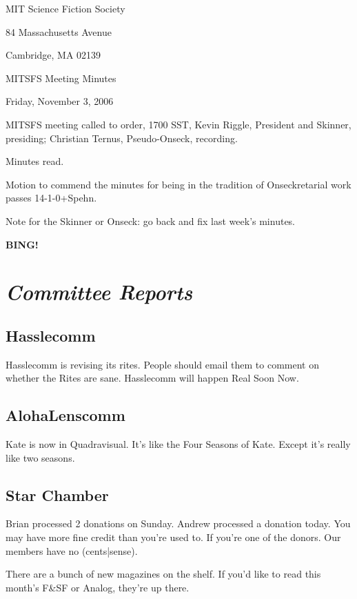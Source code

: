 \documentclass[10pt]{article}
\newcommand{\bing}{{\bf BING!} }
\newcommand{\goto}[1]{\bing \vskip 12pt \section*{{\em{#1}}}}
\begin{document}
\begin{center}

MIT Science Fiction Society

84 Massachusetts Avenue

Cambridge, MA 02139

\vspace{12pt}

MITSFS Meeting Minutes

Friday, November 3, 2006

\end{center}

\vspace{18pt}

\setlength{\parskip}{6pt}

\noindent
MITSFS meeting called to order, 1700 SST,
Kevin Riggle, President and Skinner, presiding; Christian Ternus, Pseudo-Onseck, recording.

Minutes read.

Motion to commend the minutes for being in the tradition of Onseckretarial work passes 14-1-0+Spehn.

Note for the Skinner or Onseck: go back and fix last week's minutes.

\goto{Committee Reports}

\subsection*{Hasslecomm}
Hasslecomm is revising its rites. People should email them to comment
on whether the Rites are sane. Hasslecomm will happen Real Soon Now.

\subsection*{AlohaLenscomm}
Kate is now in Quadravisual. It's like the Four Seasons of Kate.
Except it's really like two seasons.

\subsection*{Star Chamber}
Brian processed 2 donations on Sunday. Andrew processed a donation
today. You may have more fine credit than you're used to. If you're
one of the donors. Our members have no (cents|sense).

There are a bunch of new magazines on the shelf. If you'd like to read
this month's F\&SF or Analog, they're up there.
\end{document}
